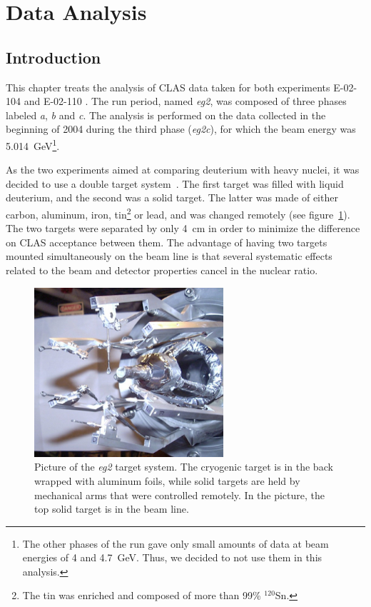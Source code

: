\section{Data Analysis}
\label{chap:analysis}

\subsection{Introduction}

This chapter treats the analysis of CLAS data taken for both 
experiments E-02-104 \cite{Brooks:2002aa} and E-02-110 \cite{Hafidi:2002aa}.
The run period, named {\it eg2}, was composed of three phases 
labeled {\it a}, {\it b} and {\it c}. The analysis is performed on the data 
collected in the beginning of 2004 during the third phase ({\it eg2c}), for 
which the beam energy was 5.014~GeV\footnote{The other phases of the run 
gave only small amounts of data at beam energies of 4 and 4.7~GeV. Thus, we 
decided to not use them in this analysis.}.

As the two experiments aimed at comparing deuterium with heavy nuclei, it was 
decided to use a double target system~\cite{Hakobyan:2008zz}. The first target 
was filled with liquid deuterium, and the second was a solid target. The 
latter was made of either carbon, aluminum, iron, tin\footnote{The tin was 
enriched and composed of more than 99\% $^{120}$Sn.} or lead, and was changed 
remotely (see figure~\ref{fig:phototarget}). The two targets were separated by 
only 4~cm in order to minimize the difference on CLAS acceptance between them. 
The advantage of having two targets mounted simultaneously on the beam line is 
that several systematic effects related to the beam and detector properties 
cancel in the nuclear ratio.

\begin{figure}[htbp]
\centering
\includegraphics[width=7cm] {chap5-fig/PhTar.jpg} 
\caption {Picture of the {\it eg2} target system. The cryogenic target is 
in the back wrapped with aluminum foils, while solid targets are held by 
mechanical arms that were controlled remotely. In the picture, the top 
solid target is in the beam line.}
\label{fig:phototarget}
\end{figure}

